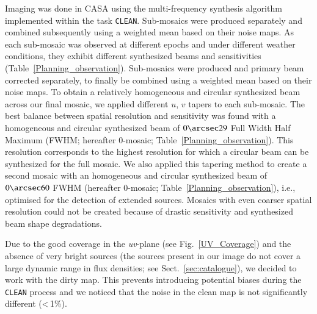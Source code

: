 \documentclass[longauth]{aa}
\begin{document}
Imaging was done in CASA using the multi-frequency synthesis algorithm implemented within the task \texttt{CLEAN}.
Sub-mosaics were produced separately and combined subsequently using a weighted mean based on their noise maps.
As each sub-mosaic was observed at different epochs and under different weather conditions, they exhibit different synthesized beams and sensitivities (Table~\ref{Planning_observation}). Sub-mosaics were produced and primary beam corrected separately, to finally be combined using a weighted mean based on their noise maps.
To obtain a relatively homogeneous and circular synthesized beam across our final mosaic, we applied different $u$, $v$ tapers to each sub-mosaic.
The best balance between spatial resolution and sensitivity was found with a homogeneous and circular synthesized beam of $0\arcsec29$ Full Width Half Maximum (FWHM; hereafter 0-mosaic; Table~\ref{Planning_observation}). This resolution corresponds to the highest resolution for which a circular beam can be synthesized for the full mosaic.
We also applied this tapering method to create a second mosaic with an homogeneous and circular synthesized beam of $0\arcsec60$ FWHM (hereafter 0-mosaic; Table~\ref{Planning_observation}), i.e., optimised for the detection of extended sources.
Mosaics with even coarser spatial resolution could not be created because of drastic sensitivity and synthesized beam shape degradations.

Due to the good coverage in the \textit{uv}-plane (see Fig.~\ref{UV_Coverage}) and the absence of very bright sources (the sources present in our image do not cover a large dynamic range in flux densities; see Sect.~\ref{sec:catalogue}), we decided to work with the dirty map. This prevents introducing potential biases during the \texttt{CLEAN} process and we noticed that the noise in the clean map is not significantly different (<\,1\%).
\end{document}
